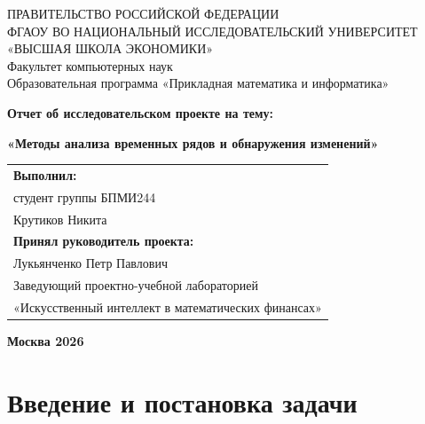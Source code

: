 \documentclass[12pt,a4paper]{article}
\begin{document}
\begin{titlepage}
\centering

\vspace*{0cm}

ПРАВИТЕЛЬСТВО РОССИЙСКОЙ ФЕДЕРАЦИИ\\[0.3cm]
ФГАОУ ВО НАЦИОНАЛЬНЫЙ ИССЛЕДОВАТЕЛЬСКИЙ УНИВЕРСИТЕТ\\[0.2cm]
«ВЫСШАЯ ШКОЛА ЭКОНОМИКИ»\\[1cm]
Факультет компьютерных наук\\[0.2cm]
Образовательная программа «Прикладная математика и информатика»

\vspace{4cm}

\textbf{Отчет об исследовательском проекте на тему:}

\vspace{0.5cm}

\textbf{«Методы анализа временных рядов и обнаружения изменений»}

\vfill

\noindent
\begin{tabular}{@{}l}
\textbf{Выполнил:}\\[0.3cm]
студент группы БПМИ244\\
Крутиков Никита\\[1cm]
\textbf{Принял руководитель проекта:}\\[0.3cm]
Лукьянченко Петр Павлович\\
Заведующий проектно-учебной лабораторией\\
«Искусственный интеллект в математических финансах»
\end{tabular}

\vspace{2cm}

\centering
\textbf{Москва 2026}

\end{titlepage}

\newpage

\tableofcontents

\newpage

\section{Введение и постановка задачи}
\end{document}
